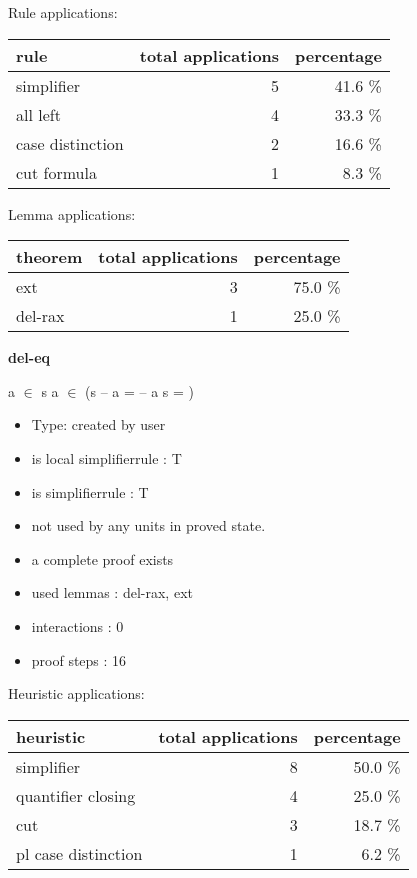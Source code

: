 \documentclass[a4paper]{article}
\begin{document}
Rule applications:

\begin{supertabular}{l|r|r}
rule	        & total applications & percentage \\ \hline
simplifier & 5 & 41.6 \% \\
all left & 4 & 33.3 \% \\
case distinction & 2 & 16.6 \% \\
cut formula & 1 & 8.3 \% \\

\end{supertabular}

Lemma applications:

\begin{supertabular}{l|r|r}
theorem	        & total applications & percentage \\ \hline
ext & 3 & 75.0 \% \\
del-rax & 1 & 25.0 \% \\

\end{supertabular}
\pagebreak

{\LARGE\bf del-eq}\label{lemma-del-eq}

\medskip

 \Fol a $\in$ s \And a $\in$  \Imp (s -- a =  -- a \Equiv s = )

\begin{itemize}

\item Type: created by user

\item is local simplifierrule : T
\item is simplifierrule : T
\item not used by any units in proved state.
\item       a complete proof exists
\item       used lemmas  : del-rax, ext
\item       interactions : 0
\item       proof steps  : 16
\end{itemize}

\medskip


Heuristic applications:

\begin{supertabular}{l|r|r}
heuristic	& total applications & percentage \\ \hline
simplifier & 8 & 50.0 \% \\
quantifier closing & 4 & 25.0 \% \\
cut & 3 & 18.7 \% \\
pl case distinction & 1 & 6.2 \% \\

\end{supertabular}
\end{document}
